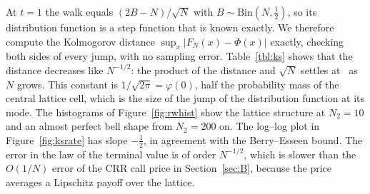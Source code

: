 At $t=1$ the walk equals $(2B-N)/\sqrt N$ with $B\sim\mathrm{Bin}(N,\tfrac12)$, so its distribution function is a step function that is known exactly.
We therefore compute the Kolmogorov distance $\sup_x|F_N(x)-\Phi(x)|$ exactly, checking both sides of every jump, with no sampling error.
Table~\ref{tbl:ks} shows that the distance decreases like $N^{-1/2}$: the product of the distance and $\sqrt N$ settles at \KSconst\ as $N$ grows.
This constant is $1/\sqrt{2\pi}=\varphi(0)$, half the probability mass of the central lattice cell, which is the size of the jump of the distribution function at its mode.
The histograms of Figure~\ref{fig:rwhist} show the lattice structure at $N_2=10$ and an almost perfect bell shape from $N_2=200$ on.
The log--log plot in Figure~\ref{fig:ksrate} has slope $-\tfrac12$, in agreement with the Berry--Esseen bound.
The error in the law of the terminal value is of order $N^{-1/2}$, which is slower than the $O(1/N)$ error of the CRR call price in Section~\ref{sec:B}, because the price averages a Lipschitz payoff over the lattice.
